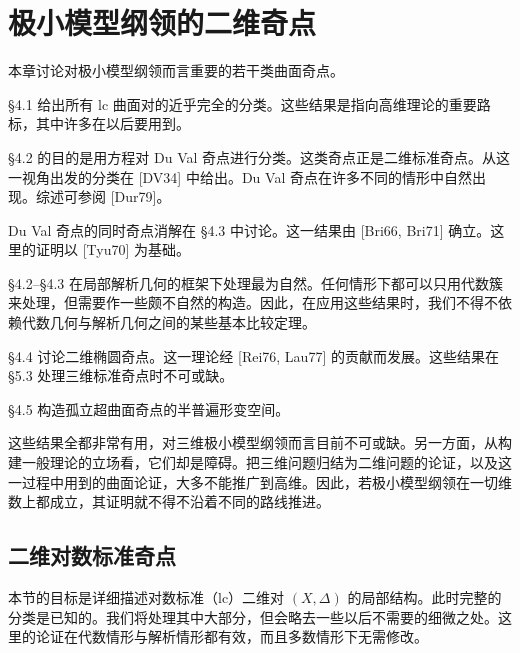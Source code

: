 \chapter{极小模型纲领的二维奇点}

本章讨论对极小模型纲领而言重要的若干类曲面奇点。

§4.1 给出所有 lc 曲面对的近乎完全的分类。这些结果是指向高维理论的重要路标，其中许多在以后要用到。

§4.2 的目的是用方程对 Du Val 奇点进行分类。这类奇点正是二维标准奇点。从这一视角出发的分类在 [DV34] 中给出。Du Val 奇点在许多不同的情形中自然出现。综述可参阅 [Dur79]。

Du Val 奇点的同时奇点消解在 §4.3 中讨论。这一结果由 [Bri66, Bri71] 确立。这里的证明以 [Tyu70] 为基础。

§4.2–§4.3 在局部解析几何的框架下处理最为自然。任何情形下都可以只用代数簇来处理，但需要作一些颇不自然的构造。因此，在应用这些结果时，我们不得不依赖代数几何与解析几何之间的某些基本比较定理。

§4.4 讨论二维椭圆奇点。这一理论经 [Rei76, Lau77] 的贡献而发展。这些结果在 §5.3 处理三维标准奇点时不可或缺。

§4.5 构造孤立超曲面奇点的半普遍形变空间。

这些结果全都非常有用，对三维极小模型纲领而言目前不可或缺。另一方面，从构建一般理论的立场看，它们却是障碍。把三维问题归结为二维问题的论证，以及这一过程中用到的曲面论证，大多不能推广到高维。因此，若极小模型纲领在一切维数上都成立，其证明就不得不沿着不同的路线推进。

\section{二维对数标准奇点}

本节的目标是详细描述对数标准（lc）二维对 $(X,\Delta)$ 的局部结构。此时完整的分类是已知的。我们将处理其中大部分，但会略去一些以后不需要的细微之处。这里的论证在代数情形与解析情形都有效，而且多数情形下无需修改。

